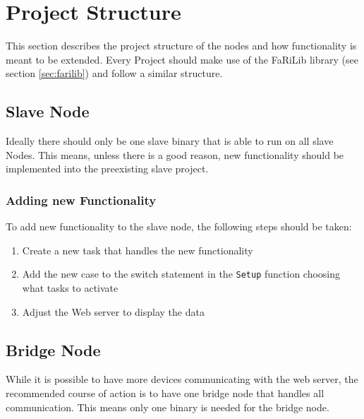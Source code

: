 \section{Project Structure} \label{sec:node_project_structure}

This section describes the project structure of the nodes
and how functionality is meant to be extended. Every Project
should make use of the FaRiLib library (see section \ref{sec:farilib})
and follow a similar structure.

    \subsection{Slave Node}
    Ideally there should only be one slave binary that is able to 
    run on all slave Nodes. This means, unless there is a good 
    reason, new functionality should be implemented into the preexisting
    slave project.
        \subsubsection{Adding new Functionality}
        To add new functionality to the slave node, the following steps
        should be taken:
        \begin{enumerate}
            \item Create a new task that handles the new functionality
            \item Add the new case to the switch statement in the
            \texttt{Setup} function choosing what tasks to activate
            \item Adjust the Web server to display the data
        \end{enumerate}

    \subsection{Bridge Node}
    While it is possible to have more devices communicating with
    the web server, the recommended course of action is to have
    one bridge node that handles all communication.
    This means only one binary is needed for the bridge node.
